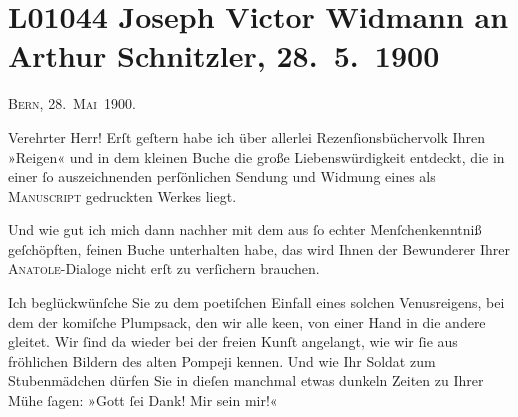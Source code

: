 

\section[Joseph Victor Widmann an Arthur Schnitzler, 28. 5. 1900]{L01044 Joseph Victor Widmann an Arthur Schnitzler, 28. 5. 1900}
\nopagebreak{}
\rehead{ }\normalsize\beginnumbering{}
\toendnotes[C]{\smallbreak\pagebreak[2]}
\toendnotes[C]{\smallbreak}
\pstart
           \raggedleft{}{\pb}\textsc{Bern, 28. Mai 1900}.\pend
           
\pstart{}Verehrter Herr!\pend\vspace{0.5em}
\pstart
           Erſt geſtern habe ich über allerlei Rezenſionsbüchervolk Ihren »Reigen« und in dem kleinen Buche die große Liebenswürdigkeit
               entdeckt, die in einer ſo auszeichnenden perſönlichen {\pb}Sendung und Widmung
               eines als \textsc{Manuscript} gedruckten Werkes liegt.\pend
           
\pstart
           Und wie gut ich mich dann nachher mit dem aus ſo echter Menſchenkenntniß geſchöpften,
               feinen Buche unterhalten habe, das wird Ihnen der Bewunderer Ihrer \textsc{Anatole}-Dialoge nicht erſt zu verſichern brauchen.\pend
           
\pstart
           Ich beglückwünſche Sie zu dem poetiſchen Einfall eines solchen Venusreigens, bei dem
               der komiſche Plumpsack, den wir alle ke{\geminationn}en, von einer
               Hand in die andere gleitet. Wir ſind da wieder bei der freien Kunſt angelangt, wie
               wir ſie aus fröhlichen Bildern des alten Pompeji
               kennen. Und wie Ihr Soldat zum
                  Stubenmädchen dürfen Sie in
               dieſen manchmal {\pb}etwas
               dunkeln Zeiten zu Ihrer Mühe ſagen: »Gott ſei Dank! Mir sein mir!«\pend
           
